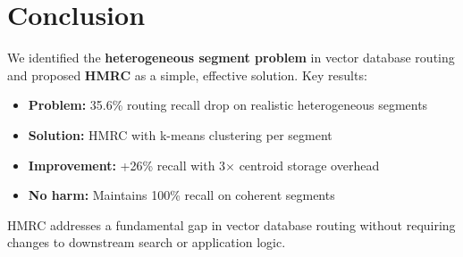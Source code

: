 \documentclass[sigconf, nonacm]{acmart}
\begin{document}

\section{Conclusion}

We identified the \textbf{heterogeneous segment problem} in vector database routing and proposed \textbf{HMRC} as a simple, effective solution. Key results:

\begin{itemize}
    \item \textbf{Problem:} 35.6\% routing recall drop on realistic heterogeneous segments
    \item \textbf{Solution:} HMRC with k-means clustering per segment
    \item \textbf{Improvement:} +26\% recall with 3$\times$ centroid storage overhead
    \item \textbf{No harm:} Maintains 100\% recall on coherent segments
\end{itemize}

HMRC addresses a fundamental gap in vector database routing without requiring changes to downstream search or application logic.



\end{document}
